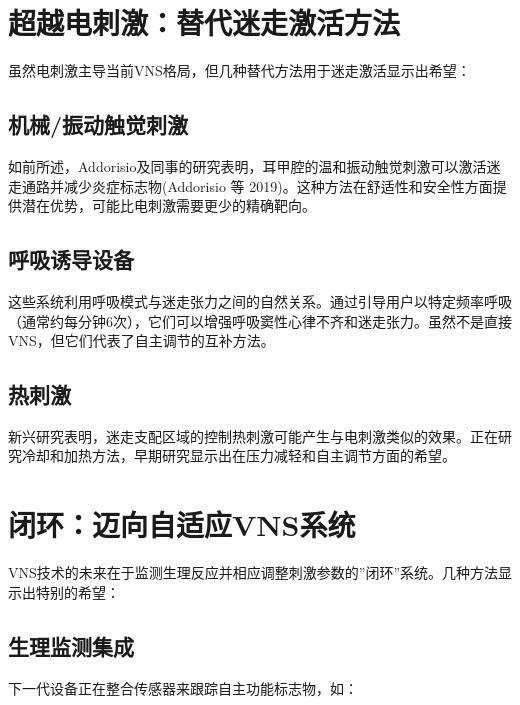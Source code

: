 \documentclass[
  Letterpaper,
]{scrbook}
\begin{document}
\section{超越电刺激：替代迷走激活方法}\label{ux8d85ux8d8aux7535ux523aux6fc0ux66ffux4ee3ux8ff7ux8d70ux6fc0ux6d3bux65b9ux6cd5}

虽然电刺激主导当前VNS格局，但几种替代方法用于迷走激活显示出希望：

\subsection{机械/振动触觉刺激}\label{ux673aux68b0ux632fux52a8ux89e6ux89c9ux523aux6fc0}

如前所述，Addorisio及同事的研究表明，耳甲腔的温和振动触觉刺激可以激活迷走通路并减少炎症标志物(Addorisio
等
2019)。这种方法在舒适性和安全性方面提供潜在优势，可能比电刺激需要更少的精确靶向。

\subsection{呼吸诱导设备}\label{ux547cux5438ux8bf1ux5bfcux8bbeux5907}

这些系统利用呼吸模式与迷走张力之间的自然关系。通过引导用户以特定频率呼吸（通常约每分钟6次），它们可以增强呼吸窦性心律不齐和迷走张力。虽然不是直接VNS，但它们代表了自主调节的互补方法。

\subsection{热刺激}\label{ux70edux523aux6fc0}

新兴研究表明，迷走支配区域的控制热刺激可能产生与电刺激类似的效果。正在研究冷却和加热方法，早期研究显示出在压力减轻和自主调节方面的希望。

\section{闭环：迈向自适应VNS系统}\label{ux95edux73afux8fc8ux5411ux81eaux9002ux5e94vnsux7cfbux7edf}

VNS技术的未来在于监测生理反应并相应调整刺激参数的''闭环''系统。几种方法显示出特别的希望：

\subsection{生理监测集成}\label{ux751fux7406ux76d1ux6d4bux96c6ux6210}

下一代设备正在整合传感器来跟踪自主功能标志物，如：
\end{document}
